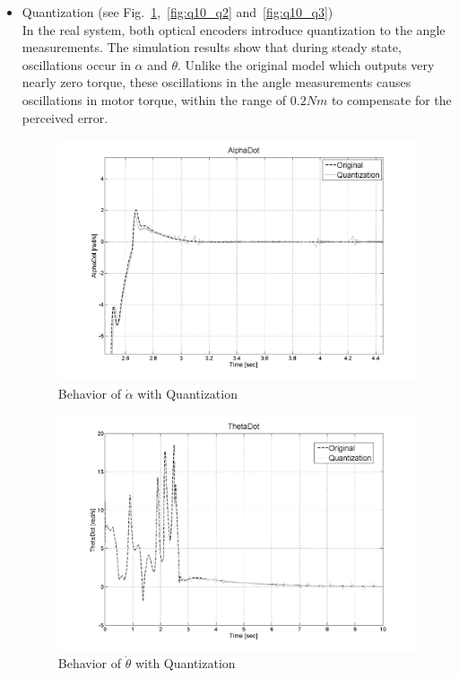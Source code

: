 \documentclass{article}
\theoremstyle{plain}
\theoremstyle{definition}
\theoremstyle{remark}
\begin{document}
\begin{itemize}
\item Quantization (see Fig.~\ref{fig:q10_q1},~\ref{fig:q10_q2} and~\ref{fig:q10_q3})\\
In the real system, both optical encoders introduce quantization to the angle measurements. The simulation results show that during steady state, oscillations occur in $\alpha$ and $\theta$.  Unlike the original model which outputs very nearly zero torque, these oscillations in the angle measurements causes oscillations in motor torque, within the range of $0.2 Nm$ to compensate for the perceived error.   
\begin{figure}[h]
\includegraphics[width=1\textwidth]{q10_q1.png}
\caption{Behavior of $\dot{\alpha}$ with Quantization} \label{tex}
\label{fig:q10_q1}
\end{figure}
\begin{figure}[h]
\includegraphics[width=1\textwidth]{q10_q2.png}
\caption{Behavior of $\dot{\theta}$ with Quantization} \label{tex}

\end{figure}
\end{itemize}
\end{document}
